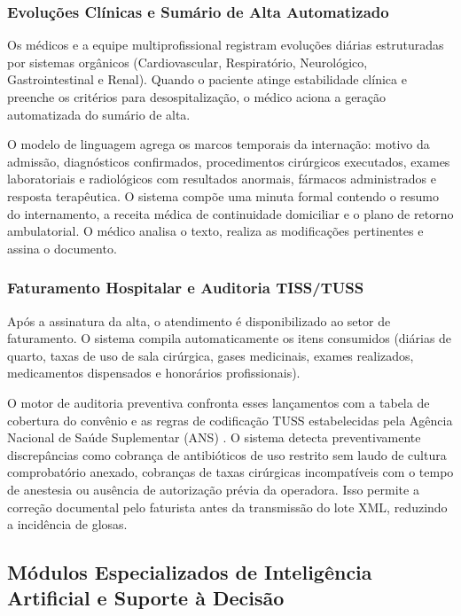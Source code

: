 \subsubsection{Evoluções Clínicas e Sumário de Alta Automatizado}
Os médicos e a equipe multiprofissional registram evoluções diárias estruturadas por sistemas orgânicos (Cardiovascular, Respiratório, Neurológico, Gastrointestinal e Renal). Quando o paciente atinge estabilidade clínica e preenche os critérios para desospitalização, o médico aciona a geração automatizada do sumário de alta.

O modelo de linguagem agrega os marcos temporais da internação: motivo da admissão, diagnósticos confirmados, procedimentos cirúrgicos executados, exames laboratoriais e radiológicos com resultados anormais, fármacos administrados e resposta terapêutica. O sistema compõe uma minuta formal contendo o resumo do internamento, a receita médica de continuidade domiciliar e o plano de retorno ambulatorial. O médico analisa o texto, realiza as modificações pertinentes e assina o documento.

\subsubsection{Faturamento Hospitalar e Auditoria TISS/TUSS}
Após a assinatura da alta, o atendimento é disponibilizado ao setor de faturamento. O sistema compila automaticamente os itens consumidos (diárias de quarto, taxas de uso de sala cirúrgica, gases medicinais, exames realizados, medicamentos dispensados e honorários profissionais).

O motor de auditoria preventiva confronta esses lançamentos com a tabela de cobertura do convênio e as regras de codificação TUSS estabelecidas pela Agência Nacional de Saúde Suplementar (ANS) \cite{ans_tiss:2023}. O sistema detecta preventivamente discrepâncias como cobrança de antibióticos de uso restrito sem laudo de cultura comprobatório anexado, cobranças de taxas cirúrgicas incompatíveis com o tempo de anestesia ou ausência de autorização prévia da operadora. Isso permite a correção documental pelo faturista antes da transmissão do lote XML, reduzindo a incidência de glosas.

\subsection{Módulos Especializados de Inteligência Artificial e Suporte à Decisão}
\label{subsec:modulos_ia}

